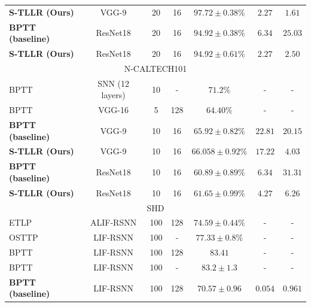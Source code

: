 \documentclass[10pt]{article} %
\begin{document}
\begin{table}[t]
{\begin{tabular}{lcccccc}
        \multicolumn{1}{l}{\textbf{S-TLLR (Ours)}} & \multicolumn{1}{c}{VGG-9} & \multicolumn{1}{c}{20} & 16 & $97.72\pm0.38\%$ & $2.27$ & $1.61$\\ %
        \multicolumn{1}{l}{\textbf{BPTT (baseline)}} & \multicolumn{1}{c}{ResNet18} & \multicolumn{1}{c}{20} & 16 & $94.92\pm0.38\%$ & $6.34$ & $25.03$\\ %
        \multicolumn{1}{l}{\textbf{S-TLLR (Ours)}} & \multicolumn{1}{c}{ResNet18} & \multicolumn{1}{c}{20} & 16 & $94.92\pm0.61\%$ & $2.27$ & $2.50$\\ %
        \midrule
        \multicolumn{7}{c}{N-CALTECH101 } \\ \hline
        \multicolumn{1}{l}{BPTT \citep{She2022SequenceMethods}} & \multicolumn{1}{c}{SNN (12 layers)} & \multicolumn{1}{c}{10} & - & $71.2\%$ & - & -\\ %
        \multicolumn{1}{l}{BPTT \citep{Kim2023SharingNetworks}} & \multicolumn{1}{c}{VGG-16} & \multicolumn{1}{c}{5} & 128 & $64.40\%$ & - & -\\ %
        \multicolumn{1}{l}{\textbf{BPTT (baseline)}} & \multicolumn{1}{c}{VGG-9} & \multicolumn{1}{c}{10} & 16 & $65.92\pm0.82\%$ & $22.81$ & $20.15$\\ %
        \multicolumn{1}{l}{\textbf{S-TLLR (Ours)}} & \multicolumn{1}{c}{VGG-9} & \multicolumn{1}{c}{10} & 16 & $66.058\pm0.92\%$ & $17.22$ & $4.03$\\ %
        \multicolumn{1}{l}{\textbf{BPTT (baseline)}} & \multicolumn{1}{c}{ResNet18} & \multicolumn{1}{c}{10} & 16 & $60.89\pm0.89\%$ & $6.34$ & $31.31$\\ %
        \multicolumn{1}{l}{\textbf{S-TLLR (Ours)}} & \multicolumn{1}{c}{ResNet18} & \multicolumn{1}{c}{10} & 16 & $61.65\pm0.99\%$ & $4.27$ & $6.26$\\ %
        \midrule
        \multicolumn{7}{c}{SHD} \\ \hline
        ETLP \citep{Quintana2023ETLP:Hardware}& ALIF-RSNN  & 100 & 128 & $74.59 \pm 0.44 \%$ & - & -\\ %
        OSTTP \citep{Ortner2023OnlineProjection} & LIF-RSNN  & 100 & -&$77.33\pm 0.8\%$ & - & - \\ %
        BPTT \citep{Bouanane2022ImpactRecognition} & LIF-RSNN  & 100 & 128 &$83.41$ & - & -\\ %
        BPTT \citep{Cramer2022TheNetworks} & LIF-RSNN  & 100 & - & $83.2\pm1.3$ & - & - \\ %
        \textbf{BPTT (baseline)} & LIF-RSNN  & 100 & 128 & $70.57\pm0.96$ & $0.054$ & $0.961$\\ %

\end{tabular}}
\end{table}
\end{document}
